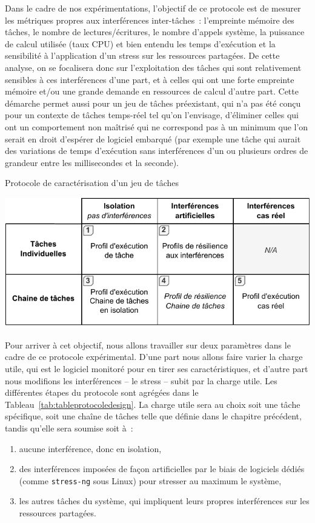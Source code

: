 \documentclass[french, a4paper, 11pt, twoside, pdftex]{StyleThese}
\begin{document}
        Dans le cadre de nos expérimentations, l'objectif de ce protocole est de mesurer les métriques propres aux interférences inter-tâches~: l'empreinte mémoire des tâches, le nombre de lectures/écritures, le nombre d'appels système, la puissance de calcul utilisée (taux CPU) et bien entendu les temps d'exécution et la sensibilité à l'application d'un stress sur les ressources partagées. De cette analyse, on se focalisera donc sur l'exploitation des tâches qui sont relativement sensibles à ces interférences d'une part, et à celles qui ont une forte empreinte mémoire et/ou une grande demande en ressources de calcul d'autre part. Cette démarche permet aussi pour un jeu de tâches préexistant, qui n'a pas été conçu pour un contexte de tâches temps-réel tel qu'on l'envisage, d'éliminer celles qui ont un comportement non maîtrisé qui ne correspond pas à un minimum que l'on serait en droit d'espérer de logiciel embarqué (par exemple une tâche qui aurait des variations de temps d'exécution sans interférences d'un ou plusieurs ordres de grandeur entre les millisecondes et la seconde).
        
        \begin{table}[ht]
        	\centering
        	\caption{Protocole de caractérisation d'un jeu de tâches}
        	\label{tab:tableprotocoledesign}
        	\includegraphics[width=0.8\linewidth]{tables/Table_Protocole_Design}
        \end{table}
             
        Pour arriver à cet objectif, nous allons travailler sur deux paramètres dans le cadre de ce protocole expérimental. D'une part nous allons faire varier la charge utile, qui est le logiciel monitoré pour en tirer ses caractéristiques, et d'autre part nous modifions les interférences -- le stress -- subit par la charge utile. Les différentes étapes du protocole sont agrégées dans le Tableau~\ref{tab:tableprotocoledesign}. La charge utile sera au choix soit une tâche spécifique, soit une chaîne de tâches telle que définie dans le chapitre précédent, tandis qu'elle sera soumise soit à~: \begin{enumerate}[label=\bfseries\alph*)] 
        	\item aucune interférence, donc en isolation,
        	\item des interférences imposées de façon artificielles par le biais de logiciels dédiés (comme \texttt{stress-ng} sous Linux) pour stresser au maximum le système,
        	\item les autres tâches du système, qui impliquent leurs propres interférences sur les ressources partagées.
        \end{enumerate}
    
\end{document}
